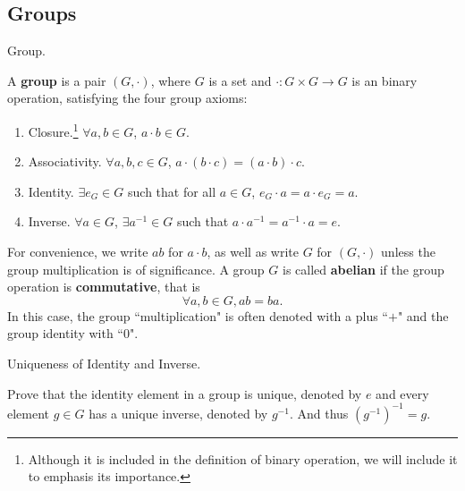 \documentclass[../book.tex]{subfiles}
\begin{document}
% 



\subsection{Groups}
\begin{dfn} Group. 

A \textbf{group} is a pair $(G, \cdot)$, where $G$ is a set and $\cdot : G\times G \rightarrow G$ is an binary operation, satisfying the four group axioms:
\begin{enumerate}
\item Closure.\footnote{Although it is included in the definition of binary operation, we will include it to emphasis its importance.}  $ \forall a,b\in G$, $a\cdot b \in G$.
\item Associativity. $ \forall a,b,c\in G$, $a \cdot (b \cdot c) = (a \cdot b) \cdot c$.
\item Identity. $ \exists e_G \in G$ such that for all $a \in G$, 
$e_G \cdot a = a \cdot e_G=a$.
\item Inverse. $ \forall a\in G$,  $ \exists a^{-1} \in G$ such that $a \cdot a^{-1} = a^{-1} \cdot a = e$.
\end{enumerate}
For convenience, we write $ab$ for $a \cdot b$, 
as well as write $G$ for $(G,\cdot)$ 
unless the group multiplication is of significance. 
A group $G$ is called \textbf{abelian} 
if the group operation is \textbf{commutative}, that is
\[\forall a, b \in G, ab = ba.\]
In this case, the group ``multiplication" is often denoted with a plus ``$+$"
and the group identity with ``$0$".

\end{dfn}


\begin{ex} Uniqueness of Identity and Inverse.

    Prove that the identity element in a group is unique, denoted by $e$ and every element $g \in G$ has a unique inverse, denoted by $g^{-1}$. And thus $(g^{-1})^{-1}=g$.
\end{ex}
\end{document}
